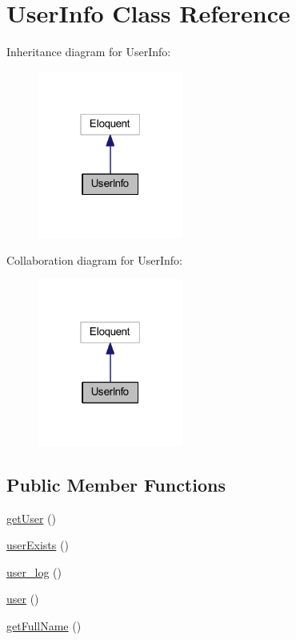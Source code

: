 \hypertarget{class_user_info}{}\section{User\+Info Class Reference}
\label{class_user_info}


Inheritance diagram for User\+Info\+:
\nopagebreak
\begin{figure}[H]
\begin{center}
\leavevmode
\includegraphics[width=135pt]{class_user_info__inherit__graph}
\end{center}
\end{figure}


Collaboration diagram for User\+Info\+:
\nopagebreak
\begin{figure}[H]
\begin{center}
\leavevmode
\includegraphics[width=135pt]{class_user_info__coll__graph}
\end{center}
\end{figure}
\subsection*{Public Member Functions}
\begin{DoxyCompactItemize}
\item 
\hyperlink{class_user_info_ae81b7186fb97a7c6457edcc68c9aa2ef}{get\+User} ()
\item 
\hyperlink{class_user_info_ad770948a208c30fc8790dc8171b63bbe}{user\+Exists} ()
\item 
\hyperlink{class_user_info_a1e13a179532130e077c281039a34d78d}{user\+\_\+log} ()
\item 
\hyperlink{class_user_info_ae8a275690ff1b618e1947378b0ed73ae}{user} ()
\item 
\hyperlink{class_user_info_a2b284f11184201a8ba8a92de57f93580}{get\+Full\+Name} ()
\end{DoxyCompactItemize}
